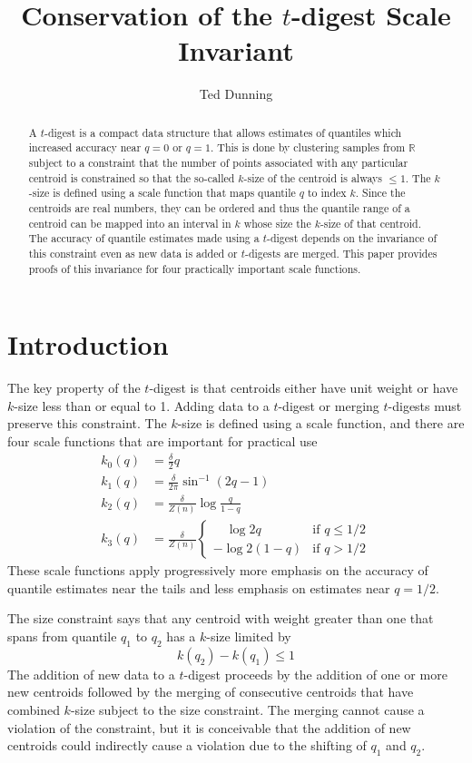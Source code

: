 \documentclass[11pt]{amsart}
\title{Conservation of the $t$-digest Scale Invariant}
\author{Ted Dunning}
\date{}                                           %
\begin{document}
\begin{abstract}
A $t$-digest is a compact data structure that allows estimates of quantiles which increased accuracy near $q = 0$ or $q=1$. This is done by clustering samples from $\mathbb R$ subject to a constraint that the number of points associated with any particular centroid is constrained so that the so-called $k$-size of the centroid is always $\le 1$. The $k$-size is defined using a scale function that maps quantile $q$ to index $k$. Since the centroids are real numbers, they can be ordered and thus the quantile range of a centroid can be mapped into an interval in $k$ whose size the $k$-size of that centroid. The accuracy of quantile estimates made using a $t$-digest  depends on the invariance of this constraint even as new data is added or $t$-digests are merged. This paper provides proofs of this invariance for four practically important scale functions.
\end{abstract}
\maketitle
\section{Introduction}
The key property of the $t$-digest is that centroids either have unit weight or have $k$-size less than or equal to 1. Adding data to a $t$-digest or merging $t$-digests must preserve this constraint. The $k$-size is defined using a scale function, and there are  four scale functions that are important for practical use 
\[
\begin{aligned}
k_0(q) &= \frac \delta 2 q \\
k_1(q) &= \frac \delta {2\pi}  \sin^{-1}(2q-1)   \\
k_2(q) &= \frac \delta {Z(n)} \log {\frac q {1-q}} \\
k_3(q) &= \frac \delta {Z(n)}\begin{cases}
\quad \log 2q & \text{if  } q \le 1/2 \\
- \log 2(1-q) & \text{if  } q > 1/2
\end{cases}
\end{aligned}
\]
These scale functions apply progressively more emphasis on the accuracy of quantile estimates near the tails and less emphasis on estimates near $q=1/2$. 
 
The size constraint says that any centroid with weight greater than one that spans from quantile $q_1$ to $q_2$ has a $k$-size  limited by
\[
k(q_2) - k(q_1) \le 1
\]
The addition of new data to a $t$-digest proceeds by the addition of one or more new centroids followed by the merging of consecutive centroids that have combined $k$-size subject to the size constraint. The merging cannot cause a violation of the constraint, but it is conceivable that the addition of new centroids could indirectly cause a violation due to the shifting of $q_1$ and $q_2$.
\end{document}
